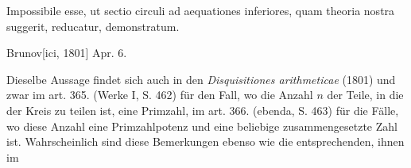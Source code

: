 \noindent\hspace*{\parindent}Impossibile esse, ut sectio circuli ad aequationes inferiores, quam theoria nostra suggerit, reducatur, demonstratum.
\par\noindent\hfill Brunov[ici, 1801] Apr. 6.
\par\medskip\begingroup\small
\noindent\hspace*{\parindent}Dieselbe Aussage findet sich auch in den \textit{Disquisitiones arithmeticae} (1801) und zwar im art. 365. (Werke I, S. 462) für den Fall, wo die Anzahl \(n\) der Teile, in die der Kreis zu teilen ist, eine Primzahl, im art. 366. (ebenda, S. 463) für die Fälle, wo diese Anzahl eine Primzahlpotenz und eine beliebige zusammengesetzte Zahl ist. Wahrscheinlich sind diese Bemerkungen ebenso wie die entsprechenden, ihnen im
\par\endgroup


